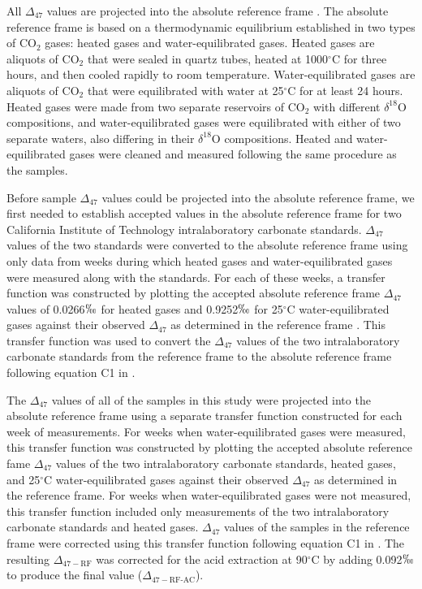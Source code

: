 \documentclass[preprint, authoryear]{elsarticle}
\begin{document}
All $\Delta_{47}$ values are projected into the absolute reference frame \citep{Dennis2011}. The absolute reference frame is based on a thermodynamic equilibrium established in two types of CO$_2$ gases: heated gases and water-equilibrated gases. Heated gases are aliquots of CO$_2$ that were sealed in quartz tubes, heated at 1000$^{\circ}$C for three hours, and then cooled rapidly to room temperature. Water-equilibrated gases are aliquots of CO$_2$ that were equilibrated with water at 25$^{\circ}$C for at least 24 hours. Heated gases were made from two separate reservoirs of CO$_2$ with different $\delta^{18}$O compositions, and water-equilibrated gases were equilibrated with either of two separate waters, also differing in their $\delta^{18}$O compositions. Heated and water-equilibrated gases were cleaned and measured following the same procedure as the samples.

Before sample $\Delta_{47}$ values could be projected into the absolute reference frame, we first needed to establish accepted values in the absolute reference frame for two California Institute of Technology intralaboratory carbonate standards. $\Delta_{47}$ values of the two standards were converted to the absolute reference frame using only data from weeks during which heated gases and water-equilibrated gases were measured along with the standards. For each of these weeks, a transfer function was constructed by plotting the accepted absolute reference frame $\Delta_{47}$ values of 0.0266$\permil$ for heated gases and 0.9252$\permil$ for 25$^{\circ}$C water-equilibrated gases against their observed $\Delta_{47}$ as determined in the \cite{Ghosh2006} reference frame \citep{Dennis2011}. This transfer function was used to convert the $\Delta_{47}$ values of the two intralaboratory carbonate standards from the \cite{Ghosh2006} reference frame to the absolute reference frame following equation C1 in \cite{Dennis2011}.

The $\Delta_{47}$ values of all of the samples in this study were projected into the absolute reference frame using a separate transfer function constructed for each week of measurements. For weeks when water-equilibrated gases were measured, this transfer function was constructed by plotting the accepted absolute reference fame $\Delta_{47}$ values of the two intralaboratory carbonate standards, heated gases, and 25$^{\circ}$C water-equilibrated gases against their observed $\Delta_{47}$ as determined in the \cite{Ghosh2006} reference frame. For weeks when water-equilibrated gases were not measured, this transfer function included only measurements of the two intralaboratory carbonate standards and heated gases. $\Delta_{47}$ values of the samples in the \cite{Ghosh2006} reference frame were corrected using this transfer function following equation C1 in \cite{Dennis2011}. The resulting $\Delta_{47-\text{RF}}$ was corrected for the acid extraction at 90$^{\circ}$C by adding 0.092$\permil$ \citep{Henkes2013} to produce the final value ($\Delta_{47-\text{RF-AC}}$).
\end{document}
